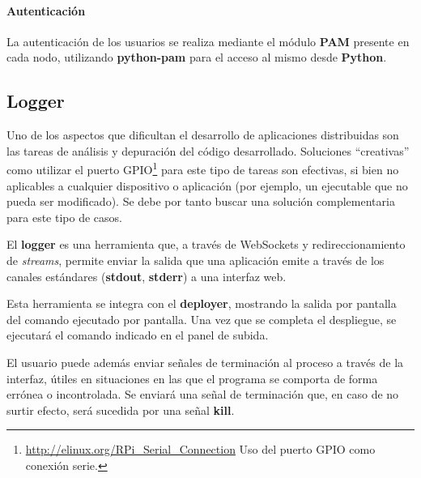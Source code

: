 \paragraph{Autenticación}

La autenticación de los usuarios se realiza mediante el módulo \textbf{PAM} presente en cada nodo\cite{osf:rfc86}, utilizando \textbf{python-pam} para el acceso al mismo desde \textbf{Python}\cite{python-am}.


\subsection{Logger}

Uno de los aspectos que dificultan el desarrollo de aplicaciones distribuidas son las tareas de análisis y depuración del código desarrollado. Soluciones ``creativas'' como utilizar el puerto GPIO\footnote{\href{http://elinux.org/RPi\_Serial\_Connection}{http://elinux.org/RPi\_Serial\_Connection} Uso del puerto GPIO como conexión serie.} para este tipo de tareas son efectivas, si bien no aplicables a cualquier dispositivo o aplicación (por ejemplo, un ejecutable que no pueda ser modificado). Se debe por tanto buscar una solución complementaria para este tipo de casos.

El \textbf{logger} es una herramienta que, a través de WebSockets y redireccionamiento de \textit{streams}, permite enviar la salida que una aplicación emite a través de los canales estándares (\textbf{stdout}, \textbf{stderr}) a una interfaz web.

Esta herramienta se integra con el \textbf{deployer}, mostrando la salida por pantalla del comando ejecutado por pantalla. Una vez que se completa el despliegue, se ejecutará el comando indicado en el panel de subida.

El usuario puede además enviar señales de terminación al proceso a través de la interfaz, útiles en situaciones en las que el programa se comporta de forma errónea o incontrolada. Se enviará una señal de terminación que, en caso de no surtir efecto, será sucedida por una señal \textbf{kill}. 

